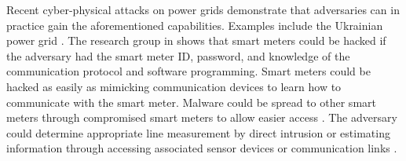 \documentclass[journal]{IEEEtran}
\begin{document}
Recent cyber-physical attacks on power grids demonstrate that adversaries can in practice gain the aforementioned capabilities. Examples include 
the Ukrainian power grid  \cite{Ukrain}. 
The research group in \cite{ami} shows that smart meters could be hacked if the adversary had the smart meter ID, password, and knowledge of the communication protocol and software programming. Smart meters could be hacked as easily as mimicking communication devices to learn how to communicate with the smart meter. Malware could be spread to other smart meters through compromised smart meters to allow easier access \cite{meter}. The adversary could determine appropriate line measurement by direct intrusion or estimating information through accessing associated sensor devices or communication links \cite{attackTx,interarea}.

\end{document}
